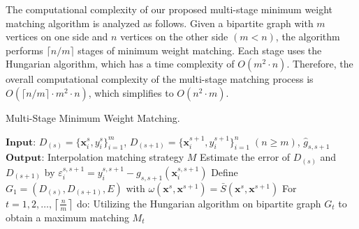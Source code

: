 \documentclass[final,3p,times]{elsarticle}
\begin{document}
{\color{myred}The computational complexity of our proposed multi-stage minimum weight matching algorithm is analyzed as follows. Given a bipartite graph with $m$ vertices on one side and $n$ vertices on the other side $(m < n)$, the algorithm performs $\lceil n / m \rceil$ stages of minimum weight matching. Each stage uses the Hungarian algorithm, which has a time complexity of $O(m^2 \cdot n)$. Therefore, the overall computational complexity of the multi-stage matching process is $O(\lceil n / m \rceil \cdot m^2 \cdot n)$, which simplifies to $O(n^2 \cdot m)$.}

\begin{algorithm}[t!]
  \caption{Multi-Stage Minimum Weight Matching.}\label{alg:alg2}
  \begin{algorithmic}
  \STATE 
  \STATE $\mathbf{Input}$: $D_{(s)}=\{\boldsymbol{x}_i^{s},y_i^s\}_{i=1}^m$, $D_{(s+1)}=\{\boldsymbol{x}_i^{s+1},y_i^{s+1}\}_{i=1}^n\;(n\ge m)$, $\hat{g}_{s,s+1}$
  \STATE $\mathbf{Output}$: Interpolation matching strategy $M$
  \vspace{5pt} %
  \STATE Estimate the error of $D_{(s)}$ and $D_{(s+1)}$ by {\color{myred}$\varepsilon_i^{s,s+1}=y_i^{s,s+1}-g_{s,s+1}(\boldsymbol{x}_i^
  {s,s+1})$}
  \STATE Define $G_1=(D_{(s)},D_{(s+1)},E)$ with $\omega(\boldsymbol{x}^{s},\boldsymbol{x}^{s+1})=\bar{S}(\boldsymbol{x}^{s},\boldsymbol{x}^{s+1})$
  \STATE For $t=1,2,\ldots,\left\lceil\frac{n}{m}\right\rceil$ do:
  \STATE \hspace{0.5cm}Utilizing the Hungarian algorithm on bipartite graph $G_t$ to obtain a maximum matching $M_t$
  \STATE {}

  \end{algorithmic}
  \label{Alg2}
\end{algorithm}
\end{document}
